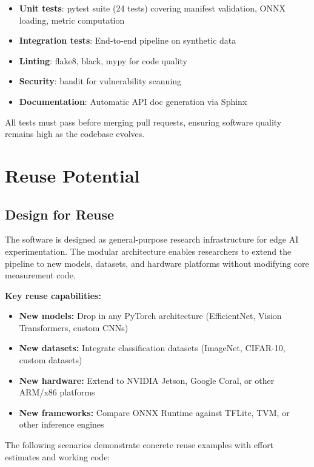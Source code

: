\documentclass[review]{elsarticle}
\begin{document}
\begin{itemize}
\item \textbf{Unit tests}: pytest suite (24 tests) covering manifest validation, ONNX loading, metric computation
\item \textbf{Integration tests}: End-to-end pipeline on synthetic data
\item \textbf{Linting}: flake8, black, mypy for code quality
\item \textbf{Security}: bandit for vulnerability scanning
\item \textbf{Documentation}: Automatic API doc generation via Sphinx
\end{itemize}

All tests must pass before merging pull requests, ensuring software quality remains high as the codebase evolves.

\section{Reuse Potential}
\label{sec:reuse}

\subsection{Design for Reuse}

The software is designed as general-purpose research infrastructure for edge AI experimentation. The modular architecture enables researchers to extend the pipeline to new models, datasets, and hardware platforms without modifying core measurement code.

\textbf{Key reuse capabilities:}

\begin{itemize}
\item \textbf{New models:} Drop in any PyTorch architecture (EfficientNet, Vision Transformers, custom CNNs)
\item \textbf{New datasets:} Integrate classification datasets (ImageNet, CIFAR-10, custom datasets)
\item \textbf{New hardware:} Extend to NVIDIA Jetson, Google Coral, or other ARM/x86 platforms
\item \textbf{New frameworks:} Compare ONNX Runtime against TFLite, TVM, or other inference engines
\end{itemize}

The following scenarios demonstrate concrete reuse examples with effort estimates and working code:
\end{document}
